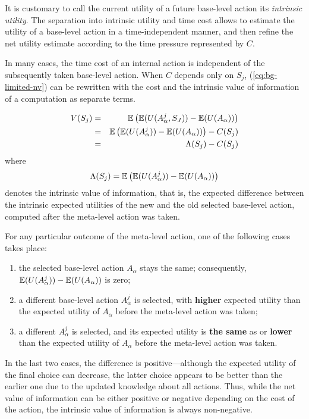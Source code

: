 It is customary to call the current utility of a future base-level
action its {\em intrinsic utility}. The separation into intrinsic
utility and time cost allows to estimate the utility of a base-level
action in a time-independent manner, and then refine the net utility
estimate according to the time pressure represented by $C$.

In many cases, the time cost of an internal action is independent of
the subsequently taken base-level action. When $C$ depends only on
$S_j$, (\ref{eq:bg-limited-nv}) can be rewritten with the cost and the
intrinsic value of information of a computation as separate terms.

\begin{eqnarray}
\label{eq:bg-limited-v=bc}
V(S_j)&=&\mathbb{E}\left(\mathbb{E}(U(A_\alpha^j, S_J))-\mathbb{E}(U(A_\alpha))\right)\nonumber\\
     &=&\mathbb{E}\left(\mathbb{E}(U(A_\alpha^j))-\mathbb{E}(U(A_\alpha))\right)-C(S_j)\\
     &=& \Lambda(S_j)-C(S_j)
\end{eqnarray}
where
\begin{equation}
\label{eq:bg-limited-benefit}
\Lambda(S_j)=\mathbb{E}\left(\mathbb{E}(U(A_\alpha^j))-\mathbb{E}(U(A_\alpha))\right)
\end{equation}
denotes the intrinsic value of information, that is, the expected
difference between the intrinsic expected utilities of the new
and the old selected base-level action, computed after the meta-level
action was taken.

For any particular outcome of the meta-level action, one of the
following cases takes place:

\begin{enumerate}
\item the selected base-level action $A_\alpha$ stays the same;
  consequently, $\mathbb{E}(U(A_\alpha^j))-\mathbb{E}(U(A_\alpha))$ is zero;
\item a different base-level action $A_\alpha^j$ is selected, with
  {\bf higher} expected utility than the expected utility of
  $A_\alpha$ before the meta-level action was taken;
\item a different $A_\alpha^j$ is selected, and its expected
  utility is {\bf the same} as or {\bf lower} than the expected
  utility of $A_\alpha$ before the meta-level action was taken.
\end{enumerate}

In the last two cases, the difference is positive---although the
expected utility of the final choice can decrease, the latter
choice appears to be better than the earlier one due
to the updated knowledge about all actions. Thus, while the
net value of information can be either positive or negative depending on
the cost of the action, the intrinsic value of information is always
non-negative.


